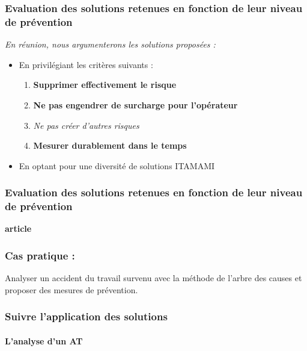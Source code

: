 \documentclass{beamer}
\begin{document}
\begin{frame}
\frametitle{Evaluation des solutions retenues en fonction de leur niveau de prévention}

\textit{En réunion, nous argumenterons les solutions proposées :}
\begin{itemize}
\item En privilégiant les critères suivants :
\begin{enumerate}
\item \textbf{Supprimer effectivement le risque}
\item  \textbf{Ne pas engendrer de surcharge pour l’opérateur}
\item \textit{Ne pas créer d’autres risques}
\item  \textbf{Mesurer durablement dans le temps}
\end{enumerate}

\item En optant pour une diversité de solutions ITAMAMI
\end{itemize}
\end{frame}

\begin{frame}
\frametitle{Evaluation des solutions retenues en fonction de leur niveau de prévention}

\textbf{article}
\end{frame}

\begin{frame}
\frametitle{Cas pratique :}

Analyser un accident du travail survenu avec la méthode de l’arbre des causes et proposer des mesures de prévention.
\end{frame}

\begin{frame}
\frametitle{Suivre l’application des solutions}
\framesubtitle{L’analyse d'un AT}

\end{frame}
\end{document}
